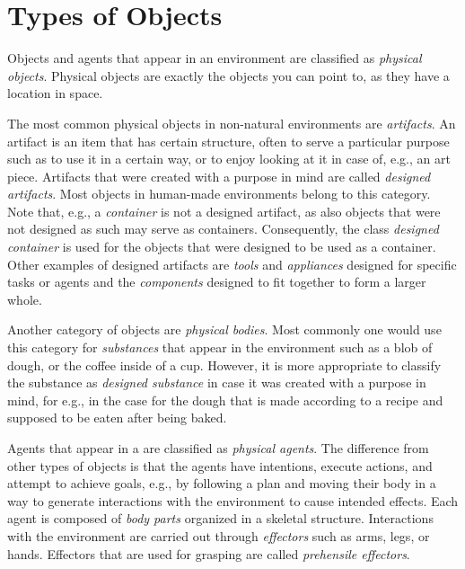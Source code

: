 \section{Types of Objects}
\label{sec:background:types}

Objects and agents that appear in an environment are classified as \emph{physical objects}.
Physical objects are exactly the objects you can point to, as they have a location in space.

The most common physical objects in non-natural environments are \emph{artifacts}.
An artifact is an item that has certain structure, often to serve a particular purpose such as to use it in a certain way, or to enjoy looking at it in case of, e.g., an art piece.
Artifacts that were created with a purpose in mind are called \emph{designed artifacts}.
Most objects in human-made environments belong to this category.
Note that, e.g., a \emph{container} is not a designed artifact, as also objects that were not designed as such may serve as containers.
Consequently, the class \emph{designed container} is used for the objects that were designed to be used as a container.
Other examples of designed artifacts are \emph{tools} and \emph{appliances} designed for specific tasks or agents and the \emph{components} designed to fit together to form a larger whole.

Another category of objects are \emph{physical bodies}.
Most commonly one would use this category for \emph{substances} that appear in the environment such as a blob of dough, or the coffee inside of a cup.
However, it is more appropriate to classify the substance as \emph{designed substance} in case it was created with a purpose in mind, for e.g., in the case for the dough that is made according to a recipe and supposed to be eaten after being baked.

Agents that appear in a \neem are classified as \emph{physical agents}.
The difference from other types of objects is that the agents have intentions, execute actions, and attempt to achieve goals, e.g., by following a plan and moving their body in a way to generate interactions with the environment to cause intended effects.
Each agent is composed of \emph{body parts} organized in a skeletal structure. 
Interactions with the environment are carried out through \emph{effectors} such as arms, legs, or hands.
Effectors that are used for grasping are called \emph{prehensile effectors}.

